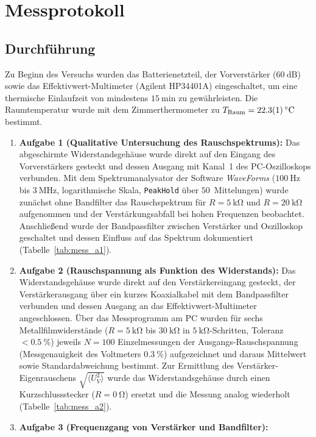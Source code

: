 \documentclass[12pt,a4paper,titlepage]{scrartcl}
\numberwithin{equation}{section}
\numberwithin{table}{section}
\numberwithin{figure}{section}
\begin{document}
\section{Messprotokoll}       

\subsection{Durchführung}
Zu Beginn des Versuchs wurden das Batterienetzteil, der Vorverstärker ($\SI{60}{\deci\bel}$) sowie das Effektivwert-Multimeter (Agilent HP34401A) eingeschaltet, um eine thermische Einlaufzeit von mindestens $\SI{15}{\minute}$ zu gewährleisten. Die Raumtemperatur wurde mit dem Zimmerthermometer zu $T_{\text{Raum}} = \SI{22.3 +- 0.1}{\celsius}$ bestimmt.

\begin{enumerate}
    \item \textbf{Aufgabe 1 (Qualitative Untersuchung des Rauschspektrums):}
    Das abgeschirmte Widerstandsgehäuse wurde direkt auf den Eingang des Vorverstärkers gesteckt und dessen Ausgang mit Kanal~1 des PC-Oszilloskops verbunden. Mit dem Spektrumanalysator der Software \emph{WaveForms} ($\SI{100}{\hertz}$ bis $\SI{3}{\mega\hertz}$, logarithmische Skala, \texttt{PeakHold} über $50$~Mittelungen) wurde zunächst ohne Bandfilter das Rauschspektrum für $R = \SI{5}{\kilo\ohm}$ und $R = \SI{20}{\kilo\ohm}$ aufgenommen und der Verstärkungsabfall bei hohen Frequenzen beobachtet. Anschließend wurde der Bandpassfilter zwischen Verstärker und Oszilloskop geschaltet und dessen Einfluss auf das Spektrum dokumentiert (Tabelle~\ref{tab:mess_a1}).
    \item \textbf{Aufgabe 2 (Rauschspannung als Funktion des Widerstands):}
    Das Widerstandsgehäuse wurde direkt auf den Verstärkereingang gesteckt, der Verstärkerausgang über ein kurzes Koaxialkabel mit dem Bandpassfilter verbunden und dessen Ausgang an das Effektivwert-Multimeter angeschlossen. Über das Messprogramm am PC wurden für sechs Metallfilmwiderstände ($R = \SI{5}{\kilo\ohm}$ bis $\SI{30}{\kilo\ohm}$ in $\SI{5}{\kilo\ohm}$-Schritten, Toleranz $<\SI{0.5}{\percent}$) jeweils $N = 100$ Einzelmessungen der Ausgangs-Rauschspannung (Messgenauigkeit des Voltmeters $\SI{0.3}{\percent}$) aufgezeichnet und daraus Mittelwert sowie Standardabweichung bestimmt. Zur Ermittlung des Verstärker-Eigenrauschens $\sqrt{\langle U_V^2 \rangle}$ wurde das Widerstandsgehäuse durch einen Kurzschlussstecker ($R = \SI{0}{\ohm}$) ersetzt und die Messung analog wiederholt (Tabelle~\ref{tab:mess_a2}).
    \item \textbf{Aufgabe 3 (Frequenzgang von Verstärker und Bandfilter):}

\end{enumerate}
\end{document}
